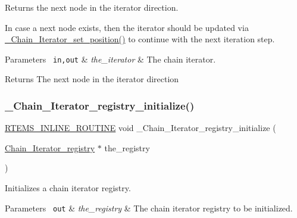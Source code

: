 Returns the next node in the iterator direction. 

In case a next node exists, then the iterator should be updated via \mbox{\hyperlink{group__RTEMSScoreChain_ga8076b5d827aefbcbc100bbf2ec0578d6}{\+\_\+\+Chain\+\_\+\+Iterator\+\_\+set\+\_\+position()}} to continue with the next iteration step.


\begin{DoxyParams}[1]{Parameters}
\mbox{\texttt{ in,out}}  & {\em the\+\_\+iterator} & The chain iterator.\\
\hline
\end{DoxyParams}
\begin{DoxyReturn}{Returns}
The next node in the iterator direction 
\end{DoxyReturn}
\mbox{\label{group__RTEMSScoreChain_gacb051f41518e411667b7551aa7b2d1b7}} 
\subsubsection{\texorpdfstring{\_Chain\_Iterator\_registry\_initialize()}{\_Chain\_Iterator\_registry\_initialize()}}
{\footnotesize\ttfamily \mbox{\hyperlink{group__RTEMSScoreBaseDefs_gac216239df231d5dbd15e3520b0b9313f}{R\+T\+E\+M\+S\+\_\+\+I\+N\+L\+I\+N\+E\+\_\+\+R\+O\+U\+T\+I\+NE}} void \+\_\+\+Chain\+\_\+\+Iterator\+\_\+registry\+\_\+initialize (\begin{DoxyParamCaption}\item[{\mbox{\hyperlink{structChain__Iterator__registry}{Chain\+\_\+\+Iterator\+\_\+registry}} $\ast$}]{the\+\_\+registry }\end{DoxyParamCaption})}



Initializes a chain iterator registry. 


\begin{DoxyParams}[1]{Parameters}
\mbox{\texttt{ out}}  & {\em the\+\_\+registry} & The chain iterator registry to be initialized. \\
\hline
\end{DoxyParams}
\mbox{\label{group__RTEMSScoreChain_gab41311aebb8f4e50ff8e75516d5245e6}} 
